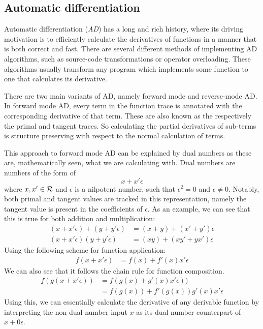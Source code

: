 \subsection{Automatic differentiation}

Automatic differentiation (\textit{AD}) has a long and rich history, where its driving motivation is to efficiently calculate the derivatives of functions in a manner that is both correct and fast\cite{Baydin2015AutomaticDI}.
There are several different methods of implementing AD algorithms, such as source-code transformations or operator overloading.
These algorithms usually transform any program which implements some function to one that calculates its derivative.

There are two main variants of AD, namely forward mode and reverse-mode AD.
In forward mode AD, every term in the function trace is annotated with the corresponding derivative of that term.
These are also known as the respectively the primal and tangent traces.
So calculating the partial derivatives of sub-terms is structure preserving with respect to the normal calculation of terms.

This approach to forward mode AD can be explained by dual numbers as these are, mathematically seen, what we are calculating with\cite{Baydin2015AutomaticDI}. Dual numbers are numbers of the form of
$$
  x + x' \epsilon
$$
where $x, x' \in \mathcal{R}$ and $\epsilon$ is a nilpotent number, such that $\epsilon^2 = 0$ and $\epsilon \neq 0$.
Notably, both primal and tangent values are tracked in this representation, namely the tangent value is present in the coefficients of $\epsilon$.
As an example, we can see that this is true for both addition and multiplication:
\begin{align*}
  (x + x' \epsilon) + (y + y' \epsilon) &= (x + y) + (x' + y')\epsilon \\
  (x + x' \epsilon)(y + y' \epsilon) &= (xy) + (xy' + yx')\epsilon
\end{align*}
Using the following scheme for function application:
\begin{align*}
  f(x + x' \epsilon) &= f(x) + f'(x)x'\epsilon
\end{align*}
We can also see that it follows the chain rule for function composition.
\begin{align*}
  f(g(x + x' \epsilon)) &= f(g(x) + g'(x)x'\epsilon)) \\
    &= f(g(x)) + f'(g(x))g'(x)x'\epsilon
\end{align*}
Using this, we can essentially calculate the derivative of any derivable function by interpreting the non-dual number input $x$ as its dual number counterpart of $x + 0\epsilon$.

